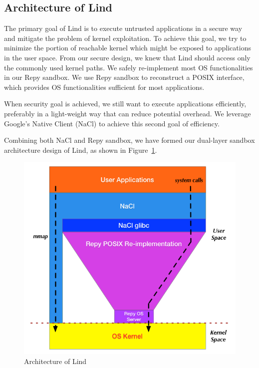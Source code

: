 \subsection{Architecture of Lind}
The primary goal of Lind is to execute untrusted applications in a secure way and mitigate the problem of kernel exploitation. 
To achieve this goal, we try to minimize the portion of reachable kernel which might be exposed to 
applications in the user space. From our secure design, we knew that Lind should access only the commonly 
used kernel paths. We safely re-implement most OS functionalities in our Repy sandbox. 
We use Repy sandbox to reconstruct a POSIX interface, which provides OS functionalities sufficient for most applications. 
   
When security goal is achieved, we still want to execute applications efficiently, preferably in a light-weight 
way that can reduce potential overhead. We leverage Google's Native Client (NaCl) to achieve
this second goal of efficiency.  

Combining both NaCl and Repy sandbox, we have formed our dual-layer sandbox architecture 
design of Lind, as shown in Figure~\ref{fig:architecture}. 

\begin{figure}[h]
\centering
\includegraphics[width=1.0\columnwidth]{diagram/lind_architecture.png}
\caption{Architecture of Lind}
\label{fig:architecture}
\end{figure}


